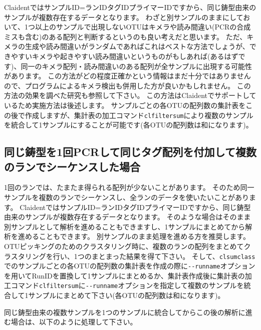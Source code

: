 \documentclass[titlepage,10pt,a4paper]{jsbook}
\begin{document}
ClaidentではサンプルID=ランID{\textunderscore}{\textunderscore}タグID{\textunderscore}{\textunderscore}プライマーIDですから、同じ鋳型由来のサンプルが複数存在するデータとなります。
わざと別サンプルのままにしておいて、1つ以上のサンプルで出現しないOTUはキメラや読み間違い(PCRの合成ミスも含む)のある配列と判断するというのも良い考えだと思います。
ただ、キメラの生成や読み間違いがランダムであればこれはベストな方法でしょうが、できやすいキメラや起きやすい読み間違いというものがもしあれば(あるはずです)、同一のキメラ配列・読み間違いのある配列が全サンプルに出現する可能性があります。
この方法がどの程度正確かという情報はまだ十分ではありませんので、プログラムによるキメラ検出も併用した方が良いかもしれません。
この方法の効果を調べた研究\citep{Lange2015}も参照して下さい。
この方法はClaidentでサポートしているため実施方法は後述します。
サンプルごとの各OTUの配列数の集計表をこの後で作成しますが、集計表の加工コマンド\texttt{clfiltersum}により複数のサンプルを統合して1サンプルにすることが可能です(各OTUの配列数は和になります)。

\subsection{同じ鋳型を1回PCRして同じタグ配列を付加して複数のランでシーケンスした場合}

1回のランでは、たまたま得られる配列が少ないことがあります。
そのため同一サンプルを複数のランでシーケンスし、全ランのデータを使いたいことがあります。
ClaidentではサンプルID=ランID{\textunderscore}{\textunderscore}タグID{\textunderscore}{\textunderscore}プライマーIDですから、同じ鋳型由来のサンプルが複数存在するデータとなります。
そのような場合はそのまま別サンプルとして解析を進めることもできますし、1サンプルにまとめてから解析を進めることもできます。
別サンプルのまま処理を進める方を推奨します。
OTUピッキングのためのクラスタリング時に、複数のランの配列をまとめてクラスタリングを行い、1つのまとまった結果を得て下さい。
そして、\texttt{clsumclass}でのサンプルごとの各OTUの配列数の集計表を作成の際に\texttt{{-}{-}runname}オプションを用いてRunIDを置換して1サンプルにまとめるか、集計表作成後に集計表の加工コマンド\texttt{clfiltersum}に\texttt{{-}{-}runname}オプションを指定して複数のサンプルを統合して1サンプルにまとめて下さい(各OTUの配列数は和になります)。

同じ鋳型由来の複数サンプルを1つのサンプルに統合してからこの後の解析に進む場合は、以下のように処理して下さい。
\end{document}
